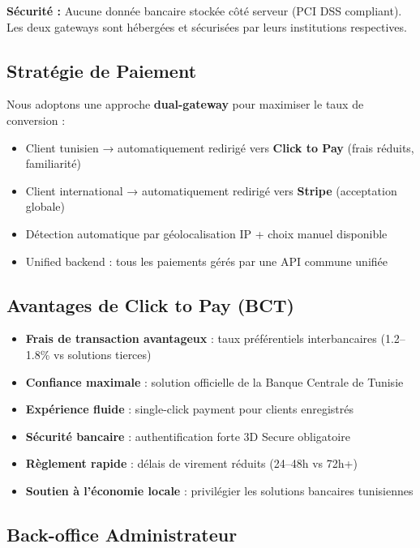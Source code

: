 \documentclass[12pt, a4paper]{article}
\begin{document}
\vspace{0.3cm}
\noindent\textbf{Sécurité :} Aucune donnée bancaire stockée côté serveur (PCI DSS compliant). Les deux gateways sont hébergées et sécurisées par leurs institutions respectives.

\subsection{Stratégie de Paiement}

Nous adoptons une approche \textbf{dual-gateway} pour maximiser le taux de conversion :
\begin{itemize}[leftmargin=*,noitemsep]
  \item Client tunisien → automatiquement redirigé vers \textbf{Click to Pay} (frais réduits, familiarité)
  \item Client international → automatiquement redirigé vers \textbf{Stripe} (acceptation globale)
  \item Détection automatique par géolocalisation IP + choix manuel disponible
  \item Unified backend : tous les paiements gérés par une API commune unifiée
\end{itemize}

\subsection{Avantages de Click to Pay (BCT)}

\begin{itemize}[leftmargin=*,noitemsep]
   \item \textbf{Frais de transaction avantageux} : taux préférentiels interbancaires (1.2--1.8\% vs solutions tierces)
   \item \textbf{Confiance maximale} : solution officielle de la Banque Centrale de Tunisie
  \item \textbf{Expérience fluide} : single-click payment pour clients enregistrés
  \item \textbf{Sécurité bancaire} : authentification forte 3D Secure obligatoire
  \item \textbf{Règlement rapide} : délais de virement réduits (24--48h vs 72h+)
  \item \textbf{Soutien à l'économie locale} : privilégier les solutions bancaires tunisiennes
\end{itemize}

\subsection{Back-office Administrateur}
\end{document}
